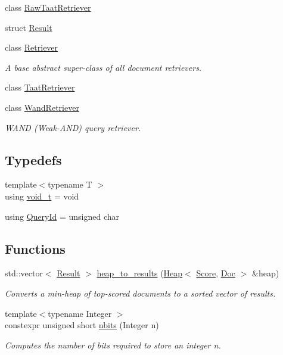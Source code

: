 \begin{DoxyCompactItemize}
class \hyperlink{classbloodhound_1_1query_1_1RawTaatRetriever}{Raw\+Taat\+Retriever}
\item 
struct \hyperlink{structbloodhound_1_1query_1_1Result}{Result}
\item 
class \hyperlink{classbloodhound_1_1query_1_1Retriever}{Retriever}
\begin{DoxyCompactList}\small\item\em A base abstract super-\/class of all document retrievers. \end{DoxyCompactList}\item 
class \hyperlink{classbloodhound_1_1query_1_1TaatRetriever}{Taat\+Retriever}
\item 
class \hyperlink{classbloodhound_1_1query_1_1WandRetriever}{Wand\+Retriever}
\begin{DoxyCompactList}\small\item\em W\+A\+ND (Weak-\/\+A\+ND) query retriever. \end{DoxyCompactList}\end{DoxyCompactItemize}
\subsection*{Typedefs}
\begin{DoxyCompactItemize}
\item 
{\footnotesize template$<$typename T $>$ }\\using \hyperlink{namespacebloodhound_1_1query_afd658a38b784a8187f8782905cb901e6}{void\+\_\+t} = void
\item 
using \hyperlink{namespacebloodhound_1_1query_aa67214af106292b2483995adea986b08}{Query\+Id} = unsigned char
\end{DoxyCompactItemize}
\subsection*{Functions}
\begin{DoxyCompactItemize}
\item 
std\+::vector$<$ \hyperlink{structbloodhound_1_1query_1_1Result}{Result} $>$ \hyperlink{namespacebloodhound_1_1query_a5a5bc223989deaa8a8d01f86ede9252c}{heap\+\_\+to\+\_\+results} (\hyperlink{classbloodhound_1_1Heap}{Heap}$<$ \hyperlink{structbloodhound_1_1Score}{Score}, \hyperlink{structbloodhound_1_1Doc}{Doc} $>$ \&heap)
\begin{DoxyCompactList}\small\item\em Converts a min-\/heap of top-\/scored documents to a sorted vector of results. \end{DoxyCompactList}\item 
{\footnotesize template$<$typename Integer $>$ }\\constexpr unsigned short \hyperlink{namespacebloodhound_1_1query_abbedf82d8c97ed0f54a4025105288136}{nbits} (Integer n)
\begin{DoxyCompactList}\small\item\em Computes the number of bits required to store an integer n. \end{DoxyCompactList}\end{DoxyCompactItemize}


